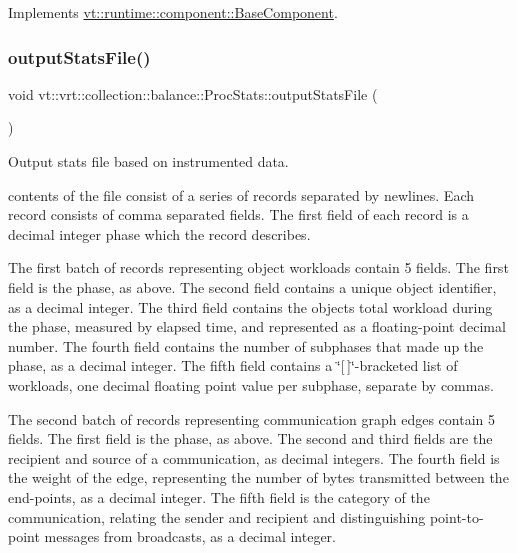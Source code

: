 Implements \hyperlink{structvt_1_1runtime_1_1component_1_1_base_component_a7701485f3539f78d42e6bad47fc7eb78}{vt\+::runtime\+::component\+::\+Base\+Component}.

\mbox{\label{structvt_1_1vrt_1_1collection_1_1balance_1_1_proc_stats_a543211533c1c2c348137069e945432a5}} 
\subsubsection{\texorpdfstring{output\+Stats\+File()}{outputStatsFile()}}
{\footnotesize\ttfamily void vt\+::vrt\+::collection\+::balance\+::\+Proc\+Stats\+::output\+Stats\+File (\begin{DoxyParamCaption}{ }\end{DoxyParamCaption})}



Output stats file based on instrumented data. 

contents of the file consist of a series of records separated by newlines. Each record consists of comma separated fields. The first field of each record is a decimal integer phase which the record describes.

The first batch of records representing object workloads contain 5 fields. The first field is the phase, as above. The second field contains a unique object identifier, as a decimal integer. The third field contains the object\textquotesingle{}s total workload during the phase, measured by elapsed time, and represented as a floating-\/point decimal number. The fourth field contains the number of subphases that made up the phase, as a decimal integer. The fifth field contains a \char`\"{}\mbox{[}$\,$\mbox{]}\char`\"{}-\/bracketed list of workloads, one decimal floating point value per subphase, separate by commas.

The second batch of records representing communication graph edges contain 5 fields. The first field is the phase, as above. The second and third fields are the recipient and source of a communication, as decimal integers. The fourth field is the weight of the edge, representing the number of bytes transmitted between the end-\/points, as a decimal integer. The fifth field is the category of the communication, relating the sender and recipient and distinguishing point-\/to-\/point messages from broadcasts, as a decimal integer. \mbox{\label{structvt_1_1vrt_1_1collection_1_1balance_1_1_proc_stats_a5b3d280cadc1a2d06de37b5d2da41ba8}} 
